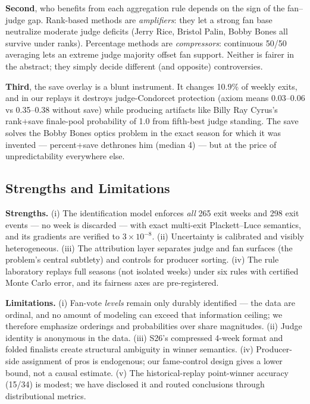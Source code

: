 \documentclass[11pt]{article}
\begin{document}
\textbf{Second}, who benefits from each aggregation rule depends on the sign of the
fan--judge gap. Rank-based methods are \emph{amplifiers}: they let a strong fan
base neutralize moderate judge deficits (Jerry Rice, Bristol Palin, Bobby Bones all
survive under ranks). Percentage methods are \emph{compressors}: continuous 50/50
averaging lets an extreme judge majority offset fan support. Neither is fairer in
the abstract; they simply decide different (and opposite) controversies.

\textbf{Third}, the save overlay is a blunt instrument. It changes 10.9\% of
weekly exits, and in our replays it destroys judge-Condorcet protection (axiom
means 0.03--0.06 vs 0.35--0.38 without save) while producing artifacts like Billy
Ray Cyrus's rank+save finale-pool probability of 1.0 from fifth-best judge
standing. The save solves the Bobby Bones optics problem in the exact season for
which it was invented --- percent+save dethrones him (median 4) --- but at the
price of unpredictability everywhere else.

\subsection{Strengths and Limitations}

\textbf{Strengths.} (i) The identification model enforces \emph{all} 265 exit
weeks and 298 exit events --- no week is discarded --- with exact multi-exit
Plackett--Luce semantics, and its gradients are verified to $3\times 10^{-8}$.
(ii) Uncertainty is calibrated and visibly heterogeneous. (iii) The attribution
layer separates judge and fan surfaces (the problem's central subtlety) and
controls for producer sorting. (iv) The rule laboratory replays full seasons (not
isolated weeks) under six rules with certified Monte Carlo error, and its fairness
axes are pre-registered.

\textbf{Limitations.} (i) Fan-vote \emph{levels} remain only durably identified ---
the data are ordinal, and no amount of modeling can exceed that information
ceiling; we therefore emphasize orderings and probabilities over share magnitudes.
(ii) Judge identity is anonymous in the data. (iii) S26's compressed 4-week format
and folded finalists create structural ambiguity in winner semantics.
(iv) Producer-side assignment of pros is endogenous; our fame-control design gives
a lower bound, not a causal estimate. (v) The historical-replay point-winner
accuracy (15/34) is modest; we have disclosed it and routed conclusions through
distributional metrics.
\end{document}

